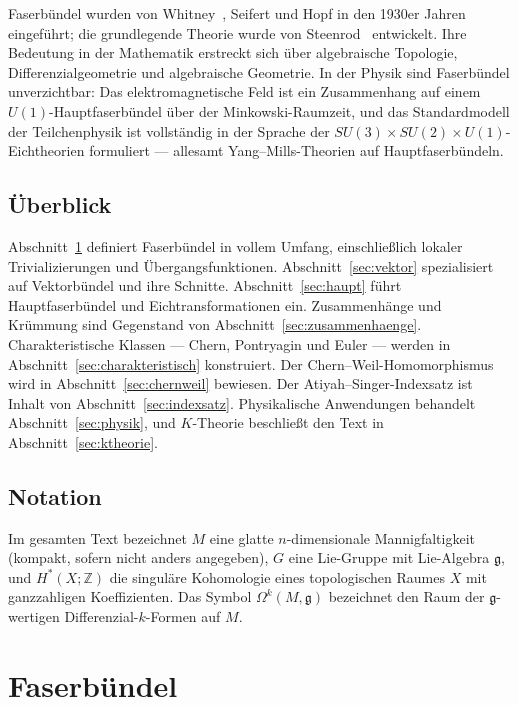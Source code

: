\documentclass[12pt,a4paper]{amsart}
\theoremstyle{definition}
\begin{document}
Faserbündel wurden von Whitney~\cite{whitney1935}, Seifert und Hopf in den 1930er
Jahren eingeführt; die grundlegende Theorie wurde von Steenrod~\cite{steenrod1951}
entwickelt. Ihre Bedeutung in der Mathematik erstreckt sich über algebraische
Topologie, Differenzialgeometrie und algebraische Geometrie. In der Physik sind
Faserbündel unverzichtbar: Das elektromagnetische Feld ist ein Zusammenhang auf
einem $U(1)$-Hauptfaserbündel über der Minkowski-Raumzeit, und das
Standardmodell der Teilchenphysik ist vollständig in der Sprache der
$SU(3) \times SU(2) \times U(1)$-Eichtheorien formuliert --- allesamt
Yang--Mills-Theorien auf Hauptfaserbündeln.

\subsection*{Überblick}
Abschnitt~\ref{sec:buendel} definiert Faserbündel in vollem Umfang, einschließlich
lokaler Trivializierungen und Übergangsfunktionen. Abschnitt~\ref{sec:vektor}
spezialisiert auf Vektorbündel und ihre Schnitte. Abschnitt~\ref{sec:haupt}
führt Hauptfaserbündel und Eichtransformationen ein. Zusammenhänge und Krümmung
sind Gegenstand von Abschnitt~\ref{sec:zusammenhaenge}. Charakteristische
Klassen --- Chern, Pontryagin und Euler --- werden in Abschnitt~\ref{sec:charakteristisch}
konstruiert. Der Chern--Weil-Homomorphismus wird in Abschnitt~\ref{sec:chernweil}
bewiesen. Der Atiyah--Singer-Indexsatz ist Inhalt von Abschnitt~\ref{sec:indexsatz}.
Physikalische Anwendungen behandelt Abschnitt~\ref{sec:physik}, und $K$-Theorie
beschließt den Text in Abschnitt~\ref{sec:ktheorie}.

\subsection*{Notation}
Im gesamten Text bezeichnet $M$ eine glatte $n$-dimensionale Mannigfaltigkeit
(kompakt, sofern nicht anders angegeben), $G$ eine Lie-Gruppe mit Lie-Algebra
$\mathfrak{g}$, und $H^*(X;\mathbb{Z})$ die singuläre Kohomologie eines
topologischen Raumes $X$ mit ganzzahligen Koeffizienten. Das Symbol
$\Omega^k(M, \mathfrak{g})$ bezeichnet den Raum der $\mathfrak{g}$-wertigen
Differenzial-$k$-Formen auf $M$.

\section{Faserbündel}
\label{sec:buendel}
\end{document}
